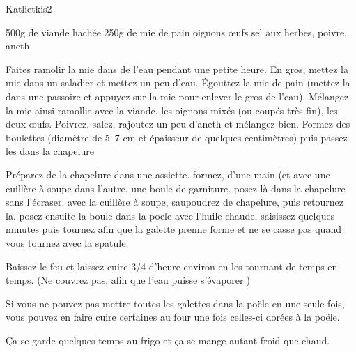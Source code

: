 \begin{recette}{Katlietkis}{2}{}{}
\begin{ingredients}
\ingredient 500g de viande hachée
\ingredient 250g de mie de pain
 oignons
 œufs
\ingredient sel aux herbes, poivre, aneth
\end{ingredients}

\begin{preparation}
\etape Faites ramolir la mie dans de l'eau pendant une petite heure. En gros, mettez la mie dans un saladier et mettez un peu d'eau.
\etape Égouttez la mie de pain (mettez la dans une passoire et appuyez sur la mie pour enlever le gros de l'eau).
\etape Mélangez la mie ainsi ramollie avec la viande, les oignons mixés (ou coupés très fin), les deux œufs. Poivrez, salez, rajoutez un peu d'aneth et mélangez bien.
\etape  Formez des boulettes (diamètre de 5--7 cm et épaisseur de quelques centimètres) puis passez les dans la chapelure


\etape Préparez de la chapelure dans une assiette.
\etape formez, d'une main (et avec une cuillère à soupe dans l'autre, une boule de garniture.
\etape posez là dans la chapelure sans l'écraser.
\etape avec la cuillère à soupe, saupoudrez de chapelure, puis retournez la.
\etape posez ensuite la boule dans la poele avec l'huile chaude, saisissez quelques minutes puis tournez afin que la galette prenne forme et ne se casse pas quand vous tournez avec la spatule.
\end{preparation}


\begin{cuisson}

Baissez le feu et laissez cuire 3/4 d'heure environ en les tournant de temps en temps. (Ne couvrez pas, afin que l'eau puisse s'évaporer.)

Si vous ne pouvez pas mettre toutes les galettes dans la poële en une seule fois, vous pouvez en faire cuire certaines au four une fois celles-ci dorées à la poële.

\begin{remarque}
Ça se garde quelques temps au frigo et ça se mange autant froid que chaud.
\end{remarque}
\end{cuisson}
\end{recette}

